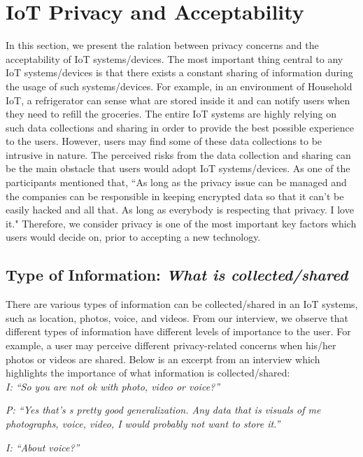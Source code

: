 \section{IoT Privacy and Acceptability}
In this section, we present the ralation between privacy concerns and the acceptability of IoT systems/devices. The most important thing central to any IoT systems/devices is that there exists a constant sharing of information during the usage of such systems/devices. For example, in an environment of Household IoT, a refrigerator can sense what are stored inside it and can notify users when they need to refill the groceries. The entire IoT systems are highly relying on such data collections and sharing in order to provide the best possible experience to the users. However, users may find some of these data collections to be intrusive in nature. The perceived risks from the data collection and sharing can be the main obstacle that users would adopt IoT systems/devices. As one of the participants mentioned that, ``As long as the privacy issue can be managed and the companies can be responsible in keeping encrypted data so that it can't be easily hacked and all that. As long as everybody is respecting that privacy. I love it." Therefore, we consider privacy is one of the most important key factors which users would decide on, prior to accepting a new technology.

\subsection{Type of Information: \textit{What is collected/shared}}
There are various types of information can be collected/shared in an IoT systems, such as location, photos, voice, and videos. From our interview, we observe that different types of information have different levels of importance to the user. For example, a user may perceive different privacy-related concerns when his/her photos or videos are shared. Below is an excerpt from an interview which highlights the importance of what information is collected/shared:\\

\textit{I: ``So you are not ok with photo, video or voice?''\\}

\textit{P: ``Yes that's s pretty good generalization. Any data that is visuals of me photographs, voice, video, I would probably not want to store it.''\\}

\textit{I: ``About voice?''\\}

